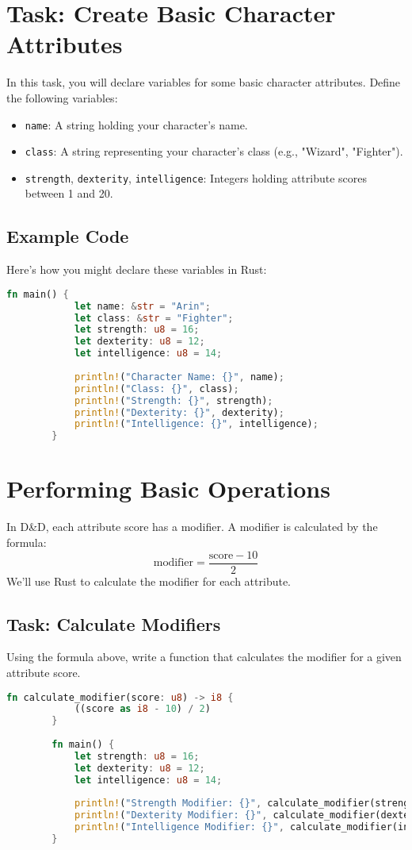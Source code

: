 \documentclass{article}
\begin{document}
	\section*{Task: Create Basic Character Attributes}
	In this task, you will declare variables for some basic character attributes. Define the following variables:
	\begin{itemize}
		\item \texttt{name}: A string holding your character’s name.
		\item \texttt{class}: A string representing your character’s class (e.g., "Wizard", "Fighter").
		\item \texttt{strength}, \texttt{dexterity}, \texttt{intelligence}: Integers holding attribute scores between 1 and 20.
	\end{itemize}
	
	\subsection*{Example Code}
	Here’s how you might declare these variables in Rust:
	
	\begin{lstlisting}[language=Rust]
		fn main() {
			let name: &str = "Arin";
			let class: &str = "Fighter";
			let strength: u8 = 16;
			let dexterity: u8 = 12;
			let intelligence: u8 = 14;
			
			println!("Character Name: {}", name);
			println!("Class: {}", class);
			println!("Strength: {}", strength);
			println!("Dexterity: {}", dexterity);
			println!("Intelligence: {}", intelligence);
		}
	\end{lstlisting}
	
	\section*{Performing Basic Operations}
	In D\&D, each attribute score has a modifier. A modifier is calculated by the formula:
	\[
	\text{modifier} = \frac{\text{score} - 10}{2}
	\]
	We’ll use Rust to calculate the modifier for each attribute.
	
	\subsection*{Task: Calculate Modifiers}
	Using the formula above, write a function that calculates the modifier for a given attribute score.
	
	\begin{lstlisting}[language=Rust]
		fn calculate_modifier(score: u8) -> i8 {
			((score as i8 - 10) / 2)
		}
		
		fn main() {
			let strength: u8 = 16;
			let dexterity: u8 = 12;
			let intelligence: u8 = 14;
			
			println!("Strength Modifier: {}", calculate_modifier(strength));
			println!("Dexterity Modifier: {}", calculate_modifier(dexterity));
			println!("Intelligence Modifier: {}", calculate_modifier(intelligence));
		}
	\end{lstlisting}
	
\end{document}

